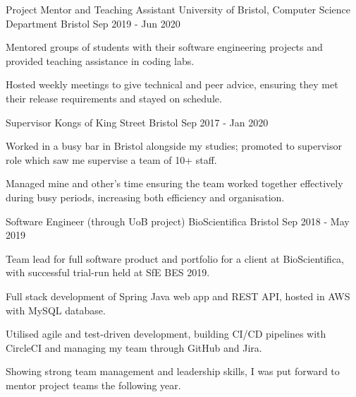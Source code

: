 \vspace{-0.1cm}

\begin{cventries}

  \cventry
    {Project Mentor and Teaching Assistant} %
    {University of Bristol, Computer Science Department} %
    {Bristol} %
    {Sep 2019 - Jun 2020} %
    {
      \begin{cvitems} %
        \item Mentored groups of students with their software engineering projects and provided teaching assistance in coding labs.
        \item Hosted weekly meetings to give technical and peer advice, ensuring they met their release requirements and stayed on schedule.
      \end{cvitems}
    }

  \cventry
    {Supervisor} %
    {Kongs of King Street} %
    {Bristol} %
    {Sep 2017 - Jan 2020} %
    {
      \begin{cvitems} %
        \item Worked in a busy bar in Bristol alongside my studies; promoted to supervisor role which saw me supervise a team of 10+ staff.
        \item Managed mine and other's time ensuring the team worked together effectively during busy periods, increasing both efficiency and organisation.
      \end{cvitems}
    }

  \cventry
    {Software Engineer (through UoB project)} %
    {BioScientifica} %
    {Bristol} %
    {Sep 2018 - May 2019} %
    {
      \begin{cvitems} %
        \item Team lead for full software product and portfolio for a client at BioScientifica, with successful trial-run held at SfE BES 2019.
        \item Full stack development of Spring Java web app and REST API, hosted in AWS with MySQL database.
        \item Utilised agile and test-driven development, building CI/CD pipelines with CircleCI and managing my team through GitHub and Jira.
        \item Showing strong team management and leadership skills, I was put forward to mentor project teams the following year.
      \end{cvitems}
    }


\end{cventries}
